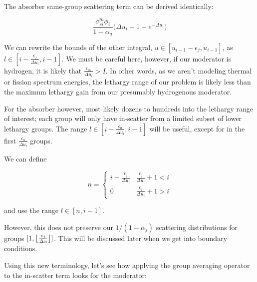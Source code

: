 \documentclass{article}
\DeclarePairedDelimiter\floor{\lfloor}{\rfloor}
\begin{document}
         The absorber same-group scattering term can be derived identically:

         \begin{equation}
            \frac{\sigma_{si}^m \phi_i}{1-\alpha_a} \big( \Delta u_i -1 + e^{-\Delta u_i} \big)
         \end{equation}


         We can rewrite the bounds of the other integral, $u \in [u_{i-1} - \epsilon_{j}, u_{i-1}]$, as \\
         $l \in [ i - \frac{\epsilon_j}{\Delta u_i},i-1]$.  
         We must be careful here, however, if our moderator is hydrogen, 
         it is likely that $\frac{\epsilon_m}{\Delta u_i} > I $.
         In other words, as we aren't modeling thermal or fission spectrum energies, 
         the lethargy range of our problem is likely less than the maximum lethargy gain from
         our presumably hydrogenous moderator. 

         For the absorber however, most likely dozens to hundreds
         into the lethargy range of interest; each group will only have in-scatter
         from a limited subset of lower lethargy groups. 
         The range
         $l \in [ i - \frac{\epsilon_a}{\Delta u_i},i-1]$ will be useful, 
         except for in the first  $\frac{\epsilon_a}{\Delta u_i}$ groups.
         
         We can define 

         \begin{equation}
             n = 
             \begin{cases} 
              i - \frac{\epsilon_j}{\Delta u_i} & \frac{\epsilon_j}{\Delta u_i} + 1< i \\
              0 & \frac{\epsilon_j}{\Delta u_i}  + 1 > i   
             \end{cases}
         \end{equation}

         and use the range 
         $l \in [ n,i-1]$. 

         However, this does not preserve our $1/(1-\alpha_j)$ scattering distributions for groups 
         $[1, \floor*{ \frac{\epsilon_j}{\Delta u} }]$. 
         This will be discussed later when we get into boundary conditions.


         Using this new terminology, let's see how applying the group averaging operator to the in-scatter
         term looks for the moderator:
\end{document}
